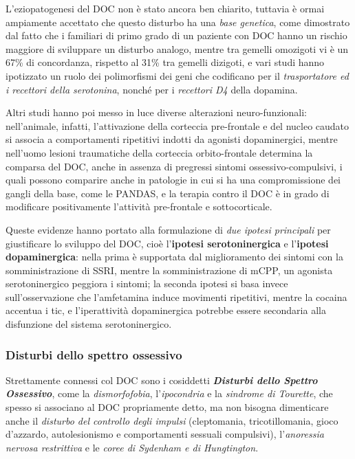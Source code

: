 L'eziopatogenesi del DOC non è stato ancora ben chiarito, tuttavia è
ormai ampiamente accettato che questo disturbo ha una \emph{base
genetica}, come dimostrato dal fatto che i familiari di primo grado di
un paziente con DOC hanno un rischio maggiore di sviluppare un disturbo
analogo, mentre tra gemelli omozigoti vi è un 67\% di concordanza,
rispetto al 31\% tra gemelli dizigoti, e vari studi hanno ipotizzato un
ruolo dei polimorfismi dei geni che codificano per il
\emph{trasportatore ed i recettori della serotonina}, nonché per i
\emph{recettori D4} della dopamina.

Altri studi hanno poi messo in luce diverse alterazioni
neuro-funzionali: nell'animale, infatti, l'attivazione della corteccia
pre-frontale e del nucleo caudato si associa a comportamenti ripetitivi
indotti da agonisti dopaminergici, mentre nell'uomo lesioni traumatiche
della corteccia orbito-frontale determina la comparsa del DOC, anche in
assenza di pregressi sintomi ossessivo-compulsivi, i quali possono
comparire anche in patologie in cui si ha una compromissione dei gangli
della base, come le PANDAS, e la terapia contro il DOC è in grado di
modificare positivamente l'attività pre-frontale e sottocorticale.

Queste evidenze hanno portato alla formulazione di \emph{due ipotesi
principali} per giustificare lo sviluppo del DOC, cioè l'\textbf{ipotesi
serotoninergica} e l'\textbf{ipotesi dopaminergica}: nella prima è
supportata dal miglioramento dei sintomi con la somministrazione di
SSRI, mentre la somministrazione di mCPP, un agonista serotoninergico
peggiora i sintomi; la seconda ipotesi si basa invece sull'osservazione
che l'amfetamina induce movimenti ripetitivi, mentre la cocaina accentua
i tic, e l'iperattività dopaminergica potrebbe essere secondaria alla
disfunzione del sistema serotoninergico.

\subsubsection{Disturbi dello spettro ossessivo}

Strettamente connessi col DOC sono i cosiddetti \textbf{\emph{Disturbi
dello Spettro Ossessivo}}, come la \emph{dismorfofobia},
l'\emph{ipocondria} e la \emph{sindrome di Tourette}, che spesso si
associano al DOC propriamente detto, ma non bisogna dimenticare anche il
\emph{disturbo del controllo degli impulsi} (cleptomania,
tricotillomania, gioco d'azzardo, autolesionismo e comportamenti
sessuali compulsivi), l'\emph{anoressia nervosa restrittiva} e le
\emph{coree di Sydenham e di Hungtington}.

